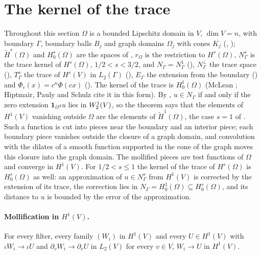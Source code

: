 \section{The kernel of the trace}
\label{sec:trace-kernel}

Throughout this section $\Omega$ is a bounded Lipschitz domain in $V$, $\dim V = n$, with boundary
$\Gamma$, boundary balls $B_j$ and graph domains $\Omega_j$ with cones $K_j$
(, ); $\tilde H^s(\Omega)$ and $H^s_0(\Omega)$ are
the spaces of , $r_\Omega$ is the restriction to
$H^s(\Omega)$, $N^s_\Gamma$ is the trace kernel of $H^s(\Omega)$, $1/2 < s < 3/2$, and
$N_\Gamma = N^1_\Gamma$ (), $N_\Gamma^\perp$ the
trace space (), $T^s_\Gamma$ the trace of $H^s(V)$ in $L_2(\Gamma)$
(), $E_\Gamma$ the extension from the boundary
() and $\Phi_c(x) = c^n \Phi(c x)$ (). The
kernel of the trace is $H^1_0(\Omega)$ (McLean \cite[Theorem 3.40]{McLean}; Hiptmair, Pauly and
Schulz \cite{HiptmairPaulySchulz} cite it in this form). By ,
$u \in N_\Gamma$ if and only if the zero extension $\mathbf 1_\Omega \iota u$ lies in
$W^{1}_{2}(V)$, so
the theorem says that the elements of $H^1(V)$ vanishing outside $\Omega$ are the elements of
$\tilde H^1(\Omega)$, the case $s = 1$ of . Such a function
is cut into pieces near the boundary and an interior piece;
each boundary piece vanishes outside the closure of a graph domain, and convolution with the dilates
of a smooth function supported in the cone of the graph moves this closure into the graph domain.
The mollified pieces are test functions of $\Omega$ and converge in $H^1(V)$. For
$1/2 < s \leq 1$ the kernel of the trace of $H^s(\Omega)$ is $H^s_0(\Omega)$ as well: an
approximation of $u \in N^s_\Gamma$ from $H^1(V)$ is corrected by the extension of its trace, the
correction lies in $N_\Gamma = H^1_0(\Omega) \subseteq H^s_0(\Omega)$, and its distance to $u$ is
bounded by the error of the approximation.

\paragraph{Mollification in $H^1(V)$.}

\begin{lemma}[Convergence in $H^1(V)$]
\label{lem:sobolev-one-convergence}
\leanok
{}
For every filter, every family $(W_i)$ in $H^1(V)$ and every $U \in H^1(V)$ with
$\iota W_i \to \iota U$ and $\partial_v W_i \to \partial_v U$ in $L_2(V)$ for every $v \in V$,
$W_i \to U$ in $H^1(V)$.
\end{lemma}

